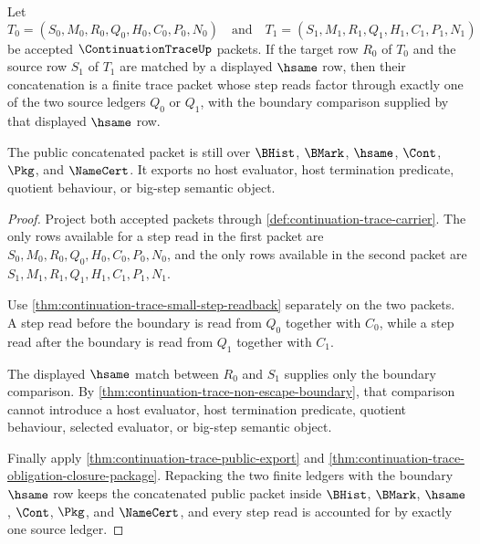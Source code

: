 \begin{theorem}
\label{thm:continuation-trace-concatenation-readback}
Let
$$
T_0=(S_0,M_0,R_0,Q_0,H_0,C_0,P_0,N_0)
\quad\text{and}\quad
T_1=(S_1,M_1,R_1,Q_1,H_1,C_1,P_1,N_1)
$$
be accepted $\ContinuationTraceUp$ packets. If the target row $R_0$ of $T_0$ and the source row $S_1$ of $T_1$ are matched by a displayed $\hsame$ row, then their concatenation is a finite trace packet whose step reads factor through exactly one of the two source ledgers $Q_0$ or $Q_1$, with the boundary comparison supplied by that displayed $\hsame$ row.

The public concatenated packet is still over $\BHist$, $\BMark$, $\hsame$, $\Cont$, $\Pkg$, and $\NameCert$. It exports no host evaluator, host termination predicate, quotient behaviour, or big-step semantic object.
\end{theorem}
\begin{proof}
Project both accepted packets through \autoref{def:continuation-trace-carrier}. The only rows available for a step read in the first packet are $S_0,M_0,R_0,Q_0,H_0,C_0,P_0,N_0$, and the only rows available in the second packet are $S_1,M_1,R_1,Q_1,H_1,C_1,P_1,N_1$.

Use \autoref{thm:continuation-trace-small-step-readback} separately on the two packets. A step read before the boundary is read from $Q_0$ together with $C_0$, while a step read after the boundary is read from $Q_1$ together with $C_1$.

The displayed $\hsame$ match between $R_0$ and $S_1$ supplies only the boundary comparison. By \autoref{thm:continuation-trace-non-escape-boundary}, that comparison cannot introduce a host evaluator, host termination predicate, quotient behaviour, selected evaluator, or big-step semantic object.

Finally apply \autoref{thm:continuation-trace-public-export} and \autoref{thm:continuation-trace-obligation-closure-package}. Repacking the two finite ledgers with the boundary $\hsame$ row keeps the concatenated public packet inside $\BHist$, $\BMark$, $\hsame$, $\Cont$, $\Pkg$, and $\NameCert$, and every step read is accounted for by exactly one source ledger.
\end{proof}

